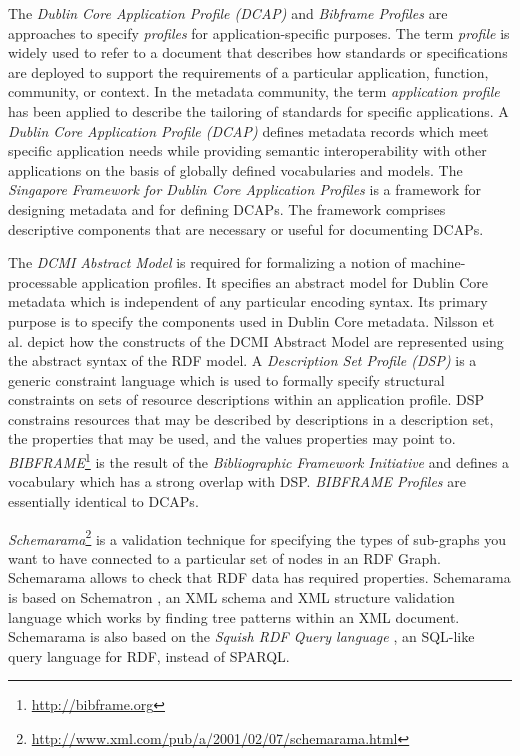 \documentclass[a4paper,fontsize=11pt]{scrartcl}
\begin{document}
The \emph{Dublin Core Application Profile (DCAP)} and \emph{Bibframe Profiles} are approaches to specify \emph{profiles} for application-specific purposes. The term \emph{profile} is widely used to refer to a document that describes how standards or specifications are deployed to support the requirements of a particular application, function, community, or context. In the metadata community, the term \emph{application profile} has been applied to describe the tailoring of standards for specific applications. A \emph{Dublin Core Application Profile (DCAP)} \cite{DCMI-DCAP-2009} defines metadata records which meet specific application needs while providing semantic interoperability with other applications on the basis of globally defined vocabularies and models. The \emph{Singapore Framework for Dublin Core Application Profiles} \cite{DCMI-Singapore-2008} is a framework for designing metadata and for defining DCAPs. The framework comprises descriptive components that are necessary or useful for documenting DCAPs.

The \emph{DCMI Abstract Model} \cite{DCMI-Abstract-Model-2007} is required for formalizing a notion of machine-processable application profiles. It specifies an abstract model for Dublin Core metadata which is independent of any particular encoding syntax. Its primary purpose is to specify the components used in Dublin Core metadata. Nilsson et al. \cite{DCMI-DC-RDF-2008} depict how the constructs of the DCMI Abstract Model are represented using the abstract syntax of the RDF model. A \emph{Description Set Profile (DSP)} \cite{DCMI-DSP-2008} is a generic constraint language which is used to formally specify structural constraints on sets of resource descriptions within an application profile. DSP constrains resources that may be described by descriptions in a description set, the properties that may be used, and the values properties may point to. \emph{BIBFRAME}\footnote{\url{http://bibframe.org}} \cite{Kroeger-2013,Godby-2015,Miller-2012} is the result of the \emph{Bibliographic Framework Initiative} and defines a vocabulary \cite{DCMI-Bibframe-Authorities-2014,DCMI-Bibframe-Relationships-2014} which has a strong overlap with DSP. \emph{BIBFRAME Profiles} \cite{DCMI-Bibframe-Profiles-2014} are essentially identical to DCAPs.

\emph{Schemarama}\footnote{\url{http://www.xml.com/pub/a/2001/02/07/schemarama.html}} is a validation technique for specifying the types of sub-graphs you want to have connected to a particular set of nodes in an RDF Graph. Schemarama allows to check that RDF data has required properties. Schemarama is based on Schematron \cite{ISO/IEC-2006}, an XML schema and XML structure validation language which works by finding tree patterns within an XML document. Schemarama is also based on the \emph{Squish RDF Query language} \cite{Miller-2001}, an SQL-like query language for RDF, instead of SPARQL. 
\end{document}
